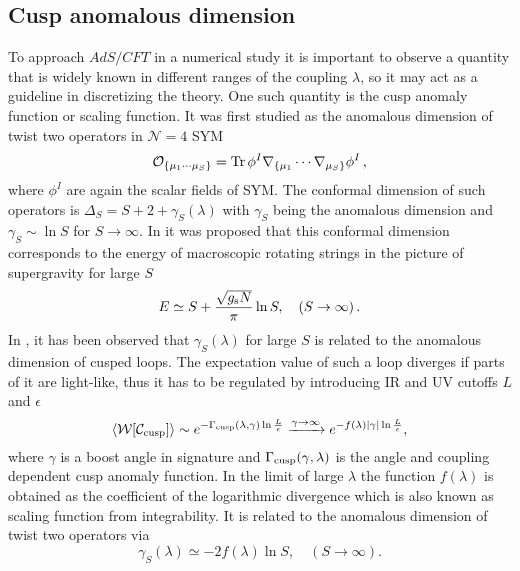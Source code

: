 \subsection{Cusp anomalous dimension}
%
%
To approach $AdS/CFT$ in a numerical study it is important to observe a quantity that is widely known in different ranges of the  coupling $\lambda$, so it may act as a guideline in discretizing the theory. One such quantity is the cusp anomaly function or scaling function. It was first studied as the anomalous dimension of twist two operators in $\mathcal{N}=4$ SYM
%
%
\begin{equation}
\mathcal{O}_{\lbrace \mu_{1}\cdots\mu_{S}\rbrace} = {\rm Tr}\, \phi^{I} \nabla_{\lbrace\mu_{1}} \cdots \nabla_{\mu_{S}\rbrace} \phi^{I}\,,
\end{equation}
%
%
where $\phi^{I}$ are again the scalar fields of SYM. The conformal dimension of such operators is $\Delta_{S} = S +2 + \gamma_{S}(\lambda)$ with $\gamma_{S}$ being the anomalous dimension and $\gamma_{S} \sim \ln S$ for $S \to \infty$. In \cite{Gubser:2002tv} it was proposed that this conformal dimension corresponds to the energy of macroscopic rotating strings in the picture of supergravity for large $S$
%
%
\begin{equation}
E \simeq S + \frac{\sqrt{g_{\rm s}N}}{\pi} \ln S , \quad  (S \to \infty)\,.
\end{equation}
%
%
In \cite{Korchemsky:1992xv}, it has been observed that $\gamma_{S}(\lambda)$ for large $S$ is related to the anomalous dimension of cusped  loops. The expectation value of such a  loop diverges if parts of it are light-like, thus it has to be regulated by introducing IR and UV cutoffs $L$ and $\epsilon$
%
%
\begin{equation}
\langle \mathcal{W}[\mathcal{C_{\rm cusp}}] \rangle \sim e^{-\Gamma_{\rm cusp}(\lambda,\gamma) \ln\frac{L}{\epsilon}}  \xrightarrow{\gamma \to \infty} e^{-f(\lambda)\vert \gamma\vert \ln \frac{L}{\epsilon}},
\label{W_f}
\end{equation}
%
%
where $\gamma$ is a boost angle in  signature and $\Gamma_{\rm cusp}(\gamma,\lambda)$ is the angle and coupling dependent cusp anomaly function. In the limit of large $\lambda$ the function $f(\lambda)$ is obtained as the coefficient of the logarithmic divergence  which is also known as scaling function from integrability. It is related to the anomalous dimension of twist two operators via \cite{Kruczenski:2002fb}
%
%
\begin{equation}
\gamma_{S}(\lambda) \simeq -2 f(\lambda) \ln S,\quad  (S\to \infty).
\end{equation}
